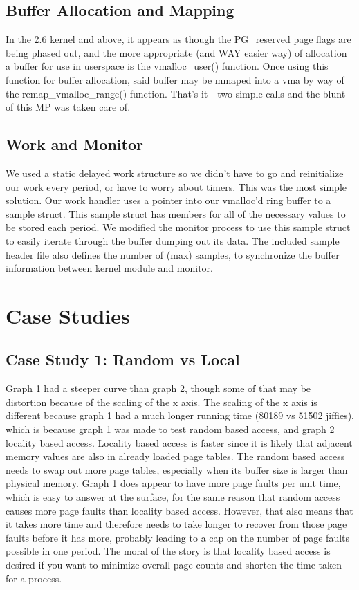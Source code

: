 \documentclass{article}
\begin{document}
\subsection{Buffer Allocation and Mapping}
In the 2.6 kernel and above, it appears as though the PG\_reserved page flags are being phased out, and the more appropriate (and WAY easier way) of allocation a buffer for use in userspace is the vmalloc\_user() function. Once using this function for buffer allocation, said buffer may be mmaped into a vma by way of the remap\_vmalloc\_range() function. That's it - two simple calls and the blunt of this MP was taken care of.

\subsection{Work and Monitor}
We used a static delayed work structure so we didn't have to go and reinitialize our work every period, or have to worry about timers. This was the most simple solution. Our work handler uses a pointer into our vmalloc'd ring buffer to a sample struct. This sample struct has members for all of the necessary values to be stored each period. We modified the monitor process to use this sample struct to easily iterate through the buffer dumping out its data. The included sample header file also defines the number of (max) samples, to synchronize the buffer information between kernel module and monitor.

\section{Case Studies}

\subsection{Case Study 1: Random vs Local}
Graph 1 had a steeper curve than graph 2, though some of that may be distortion because of the scaling of the x axis. The scaling of the x axis is different because graph 1 had a much longer running time (80189 vs 51502 jiffies), which is because graph 1 was made to test random based access, and graph 2 locality based access. Locality based access is faster since it is likely that adjacent memory values are also in already loaded page tables. The random based access needs to swap out more page tables, especially when its buffer size is larger than physical memory. Graph 1 does appear to have more page faults per unit time, which is easy to answer at the surface, for the same reason that random access causes more page faults than locality based access. However, that also means that it takes more time and therefore needs to take longer to recover from those page faults before it has more, probably leading to a cap on the number of page faults possible in one period. The moral of the story is that locality based access is desired if you want to minimize overall page counts and shorten the time taken for a process.
\end{document}
